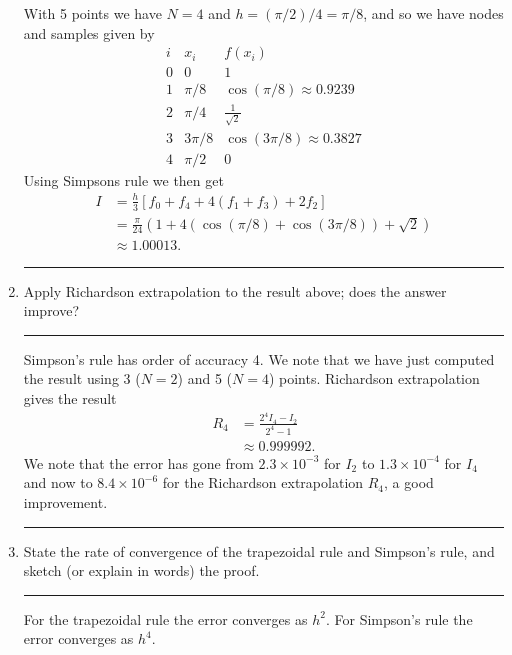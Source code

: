 \documentclass[10pt]{article}
\begin{document}
\begin{enumerate}
  With 5 points we have $N=4$ and $h=(\pi/2)/4=\pi/8$, and so we have
  nodes and samples given by
  \begin{equation*}
    \begin{array}{c|c|c}
      i & x_i & f(x_i) \\ \hline
      0 & 0 & 1 \\
      1 & \pi/8 & \cos(\pi / 8) \approx 0.9239 \\
      2 & \pi/4 & \tfrac{1}{\sqrt{2}} \\
      3 & 3\pi/8 & \cos(3 \pi / 8) \approx 0.3827\\
      4 & \pi/2 & 0
    \end{array}
  \end{equation*}
  Using Simpsons rule we then get
  \begin{align*}
    I & = \frac{h}{3} \left[ f_0 + f_4 + 4 (f_1 + f_3) + 2 f_2 \right] \\
      & = \frac{\pi}{24} \left( 1 + 4 (\cos(\pi/8) + \cos(3\pi/8)) +
        \sqrt{2} \right) \\ 
      & \approx 1.00013.
  \end{align*}
  \begin{center}
    \rule{0.9\textwidth}{.1pt}
  \end{center}
\item Apply Richardson extrapolation to the result above; does the
  answer improve?
  \begin{center}
    \rule{0.9\textwidth}{.1pt}
  \end{center}
  Simpson's rule has order of accuracy 4. We note that we have just
  computed the result using 3 ($N=2$) and 5 ($N=4$) points. Richardson
  extrapolation gives the result
  \begin{align*}
    R_4 & = \frac{2^4 I_4 - I_2}{2^4 - 1} \\
    & \approx 0.999992.
  \end{align*}
  We note that the error has gone from $2.3 \times 10^{-3}$ for $I_2$
  to $1.3 \times 10^{-4}$ for $I_4$ and now to $8.4 \times 10^{-6}$
  for the Richardson extrapolation $R_4$, a good improvement.
  \begin{center}
    \rule{0.9\textwidth}{.1pt}
  \end{center}
\item State the rate of convergence of the trapezoidal rule and
  Simpson's rule, and sketch (or explain in words) the proof.
  \begin{center}
    \rule{0.9\textwidth}{.1pt}
  \end{center}
  For the trapezoidal rule the error converges as $h^2$. For Simpson's
  rule the error converges as $h^4$.


\end{enumerate}
\end{document}
